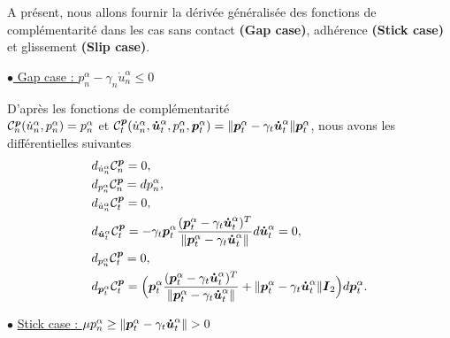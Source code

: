 A présent, nous allons fournir la dérivée généralisée des fonctions de complémentarité dans les cas sans contact \textbf{(Gap case)}, adhérence \textbf{(Stick case)} et glissement \textbf{(Slip case)}.

 \underline{$\bullet$ Gap case : $p^{\alpha}_n - \gamma_n \dot{u}^{\alpha}_n\le 0$}
 
\noindent D'après les fonctions de complémentarité\\ ${\cal C}_{n}^{\boldsymbol{p}}(\dot{u}^{\alpha}_n,p^{\alpha}_n)=p^{\alpha}_n$ et ${\cal C}_{t}^{\boldsymbol{p}}(\dot{u}^{\alpha}_n,\boldsymbol{\dot{u}}^{\alpha}_t,p^{\alpha}_n,\boldsymbol{p}^{\alpha}_t)=\|\boldsymbol{p}^{\alpha}_t - \gamma_t \boldsymbol{\dot{u}}^{\alpha}_t\|\boldsymbol{p}^{\alpha}_t$, nous avons les différentielles suivantes
\begin{align}
&d_{\dot{u}^{\alpha}_n} {\cal C}_{n}^{\boldsymbol{p}}=0\label{phi11_gran},\\
&d_{p^{\alpha}_n} {\cal C}_{n}^{\boldsymbol{p}}=d{p^{\alpha}_n}\label{phi12_gran},\\
&d_{\dot{u}^{\alpha}_n} {\cal C}_{t}^{\boldsymbol{p}}=0,\label{phi21_gran}\\
&d_{\boldsymbol{\dot{u}}^{\alpha}_t} {\cal C}_{t}^{\boldsymbol{p}}=-\gamma_t \boldsymbol{p}^{\alpha}_t\frac{(\boldsymbol{p}^{\alpha}_t - \gamma_t \boldsymbol{\dot{u}}^{\alpha}_t)^T}{\|\boldsymbol{p}^{\alpha}_t - \gamma_t \boldsymbol{\dot{u}}^{\alpha}_t\|}d{\boldsymbol{\dot{u}}^{\alpha}_t}=0,\label{phi22_gran}\\
&d_{p^{\alpha}_n} {\cal C}_{t}^{\boldsymbol{p}}=0,\label{phi23_gran}\\
&d_{\boldsymbol{p}^{\alpha}_t} {\cal C}_{t}^{\boldsymbol{p}}=\Big(\boldsymbol{p}^{\alpha}_t\frac{(\boldsymbol{p}^{\alpha}_t - \gamma_t \boldsymbol{\dot{u}}^{\alpha}_t)^T}{\|\boldsymbol{p}^{\alpha}_t - \gamma_t \boldsymbol{\dot{u}}^{\alpha}_t\|}+\|\boldsymbol{p}^{\alpha}_t - \gamma_t \boldsymbol{\dot{u}}^{\alpha}_t\|\mbox{\boldmath{$I$}}_2 \Big)d{\boldsymbol{p}^{\alpha}_t}.
\end{align}

$\bullet$ \underline{Stick case : $\mu p^{\alpha}_n\ge \|\vect{p}^{\alpha}_t - \gamma_t \vect{\dot{u}}^{\alpha}_t\|> 0$}


